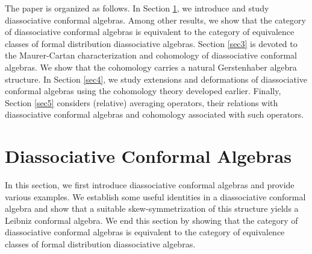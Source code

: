 \documentclass[a4paper,reqno,10pt]{amsart}
\theoremstyle{plain}
\theoremstyle{definition}
\theoremstyle{remark}
\begin{document}
\medskip

The paper is organized as follows. In Section \ref{sec2}, we introduce and study diassociative conformal algebras. Among other results, we show that the category of diassociative conformal algebras is equivalent to the category of equivalence classes of formal distribution diassociative algebras. Section \ref{sec3} is devoted to the Maurer-Cartan characterization and cohomology of diassociative conformal algebras. We show that the cohomology carries a natural Gerstenhaber algebra structure. In Section \ref{sec4}, we study extensions and deformations of diassociative conformal algebras using the cohomology theory developed earlier. Finally, Section \ref{sec5} considers (relative) averaging operators, their relations with diassociative conformal algebras and cohomology associated with such operators.

\medskip

\section{Diassociative Conformal Algebras}\label{sec2}
In this section, we first introduce diassociative conformal algebras and provide various examples. We establish some useful identities in a diassociative conformal algebra and show that a suitable skew-symmetrization of this structure yields a Leibniz conformal algebra. We end this section by showing that the category of diassociative conformal algebras is equivalent to the category of equivalence classes of formal distribution diassociative algebras.
\end{document}
